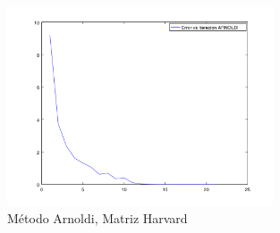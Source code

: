 \documentclass{article}
\begin{document}
\begin{figure}[p]
  \caption{Método Arnoldi, Matriz Harvard}
  \centering
    \includegraphics[width=0.7\textwidth]{ErrorVsIteracionArnoldi-Harvard.png}
\end{figure}
\end{document}
